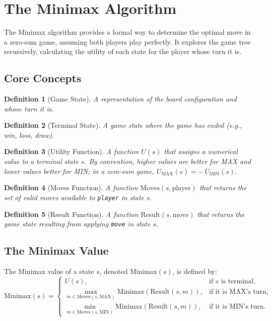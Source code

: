 \documentclass[11pt]{article}
\newtheorem{definition}{Definition}
\begin{document}
\section{The Minimax Algorithm}
The Minimax algorithm provides a formal way to determine the optimal move in a zero‑sum game, assuming both players play perfectly. It explores the game tree recursively, calculating the utility of each state for the player whose turn it is.

\subsection{Core Concepts}
\begin{definition}[Game State]
A representation of the board configuration and whose turn it is.
\end{definition}
\begin{definition}[Terminal State]
A game state where the game has ended (e.g., win, loss, draw).
\end{definition}
\begin{definition}[Utility Function]
A function $U(s)$ that assigns a numerical value to a terminal state $s$. By convention, higher values are better for MAX and lower values better for MIN; in a zero-sum game, $U_{\mathrm{MAX}}(s) = -\,U_{\mathrm{MIN}}(s)$.
\end{definition}
\begin{definition}[Moves Function]
A function $\mathrm{Moves}(s,\mathrm{player})$ that returns the set of valid moves available to \texttt{player} in state $s$.
\end{definition}
\begin{definition}[Result Function]
A function $\mathrm{Result}(s,\mathrm{move})$ that returns the game state resulting from applying \texttt{move} in state $s$.
\end{definition}

\subsection{The Minimax Value}
The Minimax value of a state $s$, denoted $\mathrm{Minimax}(s)$, is defined by:
\[
  \mathrm{Minimax}(s) =
  \begin{cases}
    U(s), 
      & \text{if $s$ is terminal},\\[6pt]
    \displaystyle
    \max_{m\in\mathrm{Moves}(s,\mathrm{MAX})}\mathrm{Minimax}(\mathrm{Result}(s,m)),
      & \text{if it is MAX’s turn},\\[6pt]
    \displaystyle
    \min_{m\in\mathrm{Moves}(s,\mathrm{MIN})}\mathrm{Minimax}(\mathrm{Result}(s,m)),
      & \text{if it is MIN’s turn}.
  \end{cases}
\]
\end{document}
